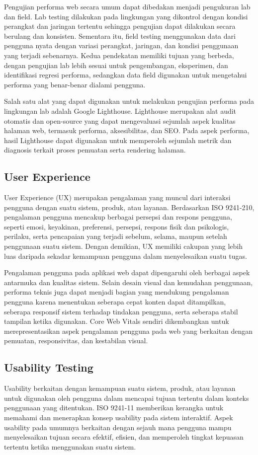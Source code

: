 \documentclass[12pt,a4paper]{report}
\begin{document}
Pengujian performa web secara umum dapat dibedakan menjadi pengukuran lab dan field. Lab testing dilakukan pada lingkungan yang dikontrol dengan kondisi perangkat dan jaringan tertentu sehingga pengujian dapat dilakukan secara berulang dan konsisten. Sementara itu, field testing menggunakan data dari pengguna nyata dengan variasi perangkat, jaringan, dan kondisi penggunaan yang terjadi sebenarnya. Kedua pendekatan memiliki tujuan yang berbeda, dengan pengujian lab lebih sesuai untuk pengembangan, eksperimen, dan identifikasi regresi performa, sedangkan data field digunakan untuk mengetahui performa yang benar-benar dialami pengguna.

Salah satu alat yang dapat digunakan untuk melakukan pengujian performa pada lingkungan lab adalah Google Lighthouse. Lighthouse merupakan alat audit otomatis dan open-source yang dapat mengevaluasi sejumlah aspek kualitas halaman web, termasuk performa, aksesibilitas, dan SEO. Pada aspek performa, hasil Lighthouse dapat digunakan untuk memperoleh sejumlah metrik dan diagnosis terkait proses pemuatan serta rendering halaman.

\subsection{User Experience}
User Experience (UX) merupakan pengalaman yang muncul dari interaksi pengguna dengan suatu sistem, produk, atau layanan. Berdasarkan ISO 9241-210, pengalaman pengguna mencakup berbagai persepsi dan respons pengguna, seperti emosi, keyakinan, preferensi, persepsi, respons fisik dan psikologis, perilaku, serta pencapaian yang terjadi sebelum, selama, maupun setelah penggunaan suatu sistem. Dengan demikian, UX memiliki cakupan yang lebih luas daripada sekadar kemampuan pengguna dalam menyelesaikan suatu tugas.

Pengalaman pengguna pada aplikasi web dapat dipengaruhi oleh berbagai aspek antarmuka dan kualitas sistem. Selain desain visual dan kemudahan penggunaan, performa teknis juga dapat menjadi bagian yang mendukung pengalaman pengguna karena menentukan seberapa cepat konten dapat ditampilkan, seberapa responsif sistem terhadap tindakan pengguna, serta seberapa stabil tampilan ketika digunakan. Core Web Vitals sendiri dikembangkan untuk merepresentasikan aspek pengalaman pengguna pada web yang berkaitan dengan pemuatan, responsivitas, dan kestabilan visual.

\subsection{Usability Testing}
Usability berkaitan dengan kemampuan suatu sistem, produk, atau layanan untuk digunakan oleh pengguna dalam mencapai tujuan tertentu dalam konteks penggunaan yang ditentukan. ISO 9241-11 memberikan kerangka untuk memahami dan menerapkan konsep usability pada sistem interaktif. Aspek usability pada umumnya berkaitan dengan sejauh mana pengguna mampu menyelesaikan tujuan secara efektif, efisien, dan memperoleh tingkat kepuasan tertentu ketika menggunakan suatu sistem.
\end{document}

